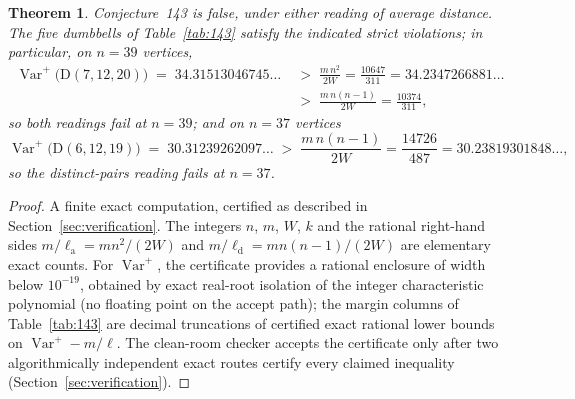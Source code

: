 \documentclass[11pt]{article}
\newtheorem{theorem}{Theorem}[section]
\theoremstyle{remark}
\newcommand{\Varp}{\operatorname{Var}^{+}}
\newcommand{\la}{\ell_{\mathrm{a}}}
\newcommand{\ld}{\ell_{\mathrm{d}}}
\newcommand{\D}{\mathrm{D}}
\begin{document}
\begin{theorem}\label{thm:143}
Conjecture~143 is false, under either reading of average distance. The five
dumbbells of Table~\ref{tab:143} satisfy the indicated strict violations; in
particular, on $n=39$ vertices,
\begin{align*}
\Varp\bigl(\D(7,12,20)\bigr) \;=\; 34.31513046745\ldots
\;&>\; \frac{m\,n^2}{2W} = \frac{10647}{311} = 34.2347266881\ldots\\
\;&>\; \frac{m\,n(n-1)}{2W} = \frac{10374}{311},
\end{align*}
so both readings fail at $n = 39$; and on $n=37$ vertices
\[
\Varp\bigl(\D(6,12,19)\bigr) \;=\; 30.31239262097\ldots
\;>\; \frac{m\,n(n-1)}{2W} = \frac{14726}{487} = 30.23819301848\ldots,
\]
so the distinct-pairs reading fails at $n = 37$.
\end{theorem}

\begin{proof}
A finite exact computation, certified as described in
Section~\ref{sec:verification}. The integers $n$, $m$, $W$, $k$ and the
rational right-hand sides $m/\la = mn^2/(2W)$ and $m/\ld = mn(n-1)/(2W)$ are
elementary exact counts. For $\Varp$, the certificate provides a rational
enclosure of width below $10^{-19}$, obtained by exact real-root isolation of
the integer characteristic polynomial (no floating point on the accept
path); the margin columns of Table~\ref{tab:143} are decimal truncations of
certified exact rational lower bounds on $\Varp - m/\ell$. The clean-room
checker accepts the certificate only after two algorithmically independent
exact routes certify every claimed inequality
(Section~\ref{sec:verification}).
\end{proof}
\end{document}
